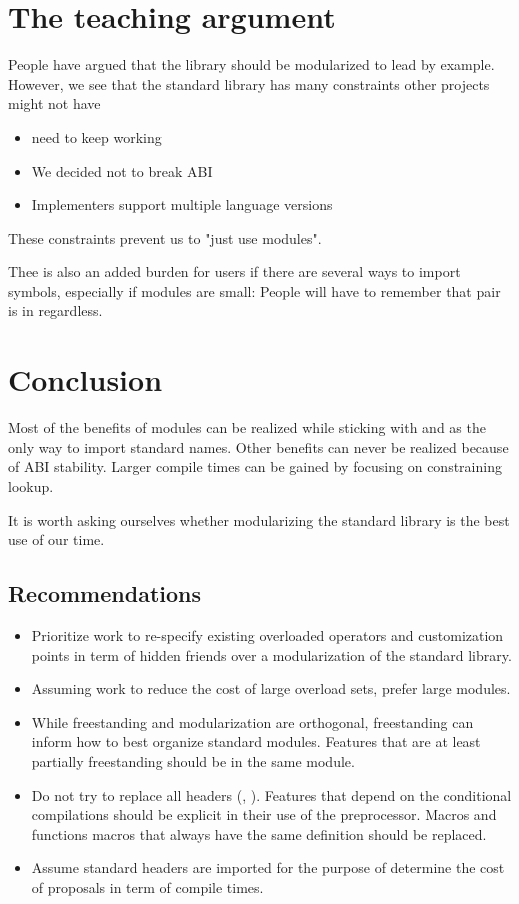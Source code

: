 \documentclass{wg21}
\begin{document}
\section{The teaching argument}

People have argued that the library should be modularized to lead by example.
However, we see that the standard library has many constraints other projects might not have

\begin{itemize}
 \item {} need to keep working
 \item We decided not to break ABI
 \item Implementers support multiple language versions
\end{itemize}

These constraints prevent us to "just use modules".

Thee is also an added burden for users if there are several ways to import symbols, especially if modules are
small: People will have to remember that pair is in  regardless.


\section{Conclusion}

Most of the benefits of modules can be realized while sticking with  and 
as the only way to import standard names.
Other benefits can never be realized because of ABI stability.
Larger compile times can be gained by focusing on constraining lookup.

It is worth asking ourselves whether modularizing the standard library is the best use of our time.

\subsection{Recommendations}

\begin{itemize}
\item Prioritize work to re-specify existing overloaded operators and customization points in term of hidden friends over a modularization of the standard library.
\item Assuming work to reduce the cost of large overload sets, prefer large modules.
\item While freestanding and modularization are orthogonal, freestanding can inform how to best organize standard modules. Features that are at least partially freestanding  should be in the same module.
\item Do not try to replace all headers (, ). Features that depend on the conditional compilations should be explicit in their use of the preprocessor. Macros and functions macros that always have the same definition should be replaced.
\item Assume standard headers are imported for the purpose of determine the cost of proposals in term of compile times.
\end{itemize}
\end{document}
